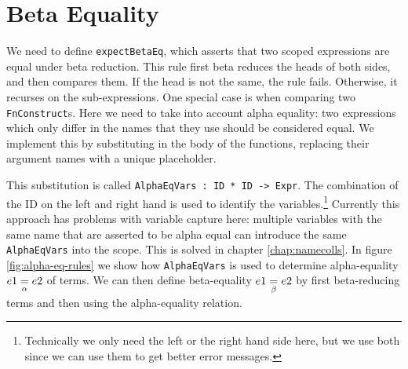 \section{Beta Equality}
\label{sec:coc-betaeq}

We need to define \verb|expectBetaEq|, which asserts that two scoped expressions are equal under beta reduction. This rule first beta reduces the heads of both sides, and then compares them. If the head is not the same, the rule fails. Otherwise, it recurses on the sub-expressions. One special case is when comparing two \verb|FnConstruct|s. Here we need to take into account alpha equality: two expressions which only differ in the names that they use should be considered equal. We implement this by substituting in the body of the functions, replacing their argument names with a unique placeholder.

This substitution is called \verb|AlphaEqVars : ID * ID -> Expr|. The combination of the ID on the left and right hand is used to identify the variables.\footnote{Technically we only need the left or the right hand side here, but we use both since we can use them to get better error messages.} Currently this approach has problems with variable capture here: multiple variables with the same name that are asserted to be alpha equal can introduce the same \verb|AlphaEqVars| into the scope. This is solved in chapter \ref{chap:namecolls}. In figure \ref{fig:alpha-eq-rules} we show how \verb|AlphaEqVars| is used to determine alpha-equality $e1 \underset{\alpha}{=} e2$ of terms. We can then define beta-equality $e1 \underset{\beta}{=} e2$ by first beta-reducing terms and then using the alpha-equality relation.

